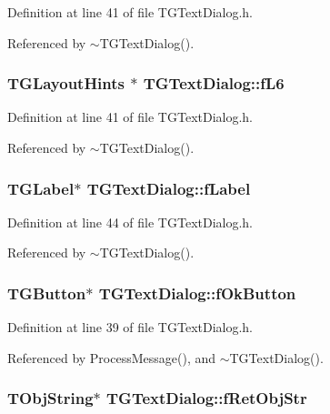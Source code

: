 Definition at line 41 of file TGTextDialog.h.

Referenced by $\sim$TGTextDialog().
\subsubsection[{fL6}]{\setlength{\rightskip}{0pt plus 5cm}TGLayoutHints $\ast$ {\bf TGTextDialog::fL6}\hspace{0.3cm}{\ttfamily  [protected]}}\label{classTGTextDialog_a383fb9fbb392650cf07c9047d840d583}


Definition at line 41 of file TGTextDialog.h.

Referenced by $\sim$TGTextDialog().
\subsubsection[{fLabel}]{\setlength{\rightskip}{0pt plus 5cm}TGLabel$\ast$ {\bf TGTextDialog::fLabel}\hspace{0.3cm}{\ttfamily  [protected]}}\label{classTGTextDialog_a3894c9670b475f813b99e6d1f4ecff7b}


Definition at line 44 of file TGTextDialog.h.

Referenced by $\sim$TGTextDialog().
\subsubsection[{fOkButton}]{\setlength{\rightskip}{0pt plus 5cm}TGButton$\ast$ {\bf TGTextDialog::fOkButton}\hspace{0.3cm}{\ttfamily  [protected]}}\label{classTGTextDialog_addb9aa1dfffbbdf7b0116568b75e31ba}


Definition at line 39 of file TGTextDialog.h.

Referenced by ProcessMessage(), and $\sim$TGTextDialog().
\subsubsection[{fRetObjStr}]{\setlength{\rightskip}{0pt plus 5cm}TObjString$\ast$ {\bf TGTextDialog::fRetObjStr}\hspace{0.3cm}{\ttfamily  [protected]}}\label{classTGTextDialog_a231d80c89f231d5948f418b5f0b8d9d7}


